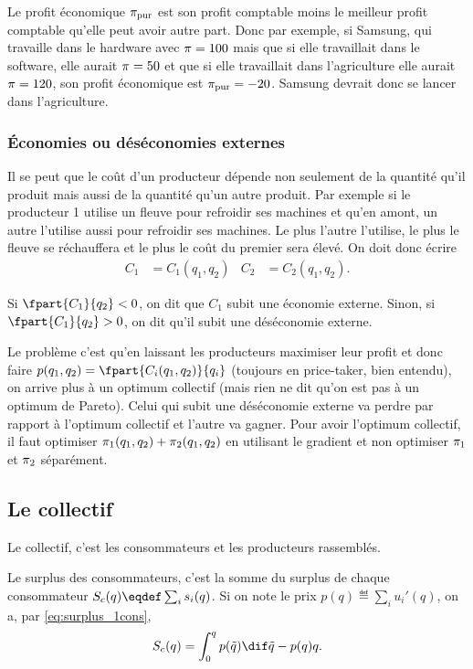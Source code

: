 Le profit économique $\pi_{\mathrm{pur}}$ est son profit comptable moins le meilleur
profit comptable qu'elle peut avoir autre part.
Donc par exemple, si Samsung, qui travaille dans le hardware avec
$\pi = 100$ mais que si elle travaillait dans le software, elle aurait
$\pi = 50$ et que si elle travaillait dans l'agriculture elle aurait
$\pi = 120$, son profit économique est $\pi_{\mathrm{pur}} = -20$.
Samsung devrait donc se lancer dans l'agriculture.

\subsubsection{Économies ou déséconomies externes}
Il se peut que le coût d'un producteur dépende non seulement de la quantité
qu'il produit mais aussi de la quantité qu'un autre produit.
Par exemple si le producteur 1 utilise un fleuve pour refroidir ses
machines et qu'en amont, un autre l'utilise aussi pour refroidir ses machines.
Le plus l'autre l'utilise, le plus le fleuve se réchauffera et le plus le
coût du premier sera élevé.
On doit donc écrire
\begin{align*}
  C_1 & = C_1(q_1, q_2) & C_2 & = C_2(q_1,q_2).
\end{align*}

Si $\fpart{C_1}{q_2} < 0$, on dit que $C_1$ subit une économie externe.
Sinon, si $\fpart{C_1}{q_2} > 0$, on dit qu'il subit une déséconomie
externe.

Le problème c'est qu'en laissant les producteurs maximiser leur profit
et donc faire $p(q_1, q_2) = \fpart{C_i(q_1, q_2)}{q_i}$
(toujours en price-taker, bien entendu),
on arrive plus à un optimum collectif
(mais rien ne dit qu'on est pas à un optimum de Pareto).
Celui qui subit une déséconomie externe va perdre par rapport à l'optimum
collectif et l'autre va gagner.
Pour avoir l'optimum collectif,
il faut optimiser $\pi_1(q_1, q_2) + \pi_2(q_1, q_2)$
en utilisant le gradient et
non optimiser $\pi_1$ et $\pi_2$ séparément.

\subsection{Le collectif}
Le collectif, c'est les consommateurs et les producteurs rassemblés.

Le surplus des consommateurs, c'est la somme du surplus de chaque consommateur
$\surpluscons(q) \eqdef \sum_i s_i(q)$.
Si on note le prix $p(q) \eqdef \sum_i u_i'(q)$, on a, par \eqref{eq:surplus_1cons},
\[ \surpluscons(q) = \int_0^{q}p(\tilde{q}) \dif \tilde{q} - p(q) q. \]

